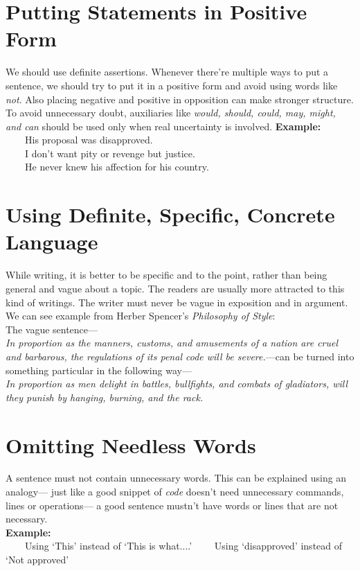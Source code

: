 \documentclass{report}
\newcommand{\xmpl}{\textbf{Example:}\\} %
\newcommand{\indnt}{\ \ \ \ } %
\begin{document}
\section{Putting Statements in Positive Form}
We should use definite assertions. Whenever there're multiple ways to put a sentence, we should try to put it in a positive form and avoid using words like \emph{not}. Also placing negative and positive in opposition can make stronger structure. To avoid unnecessary doubt, auxiliaries like \emph{would, should, could, may, might, \emph{and} can} should be used only when real uncertainty is involved.
\xmpl
\indnt His proposal was disapproved.\\
\indnt I don't want pity or revenge but justice.\\
\indnt He never knew his affection for his country.\\
\section{Using Definite, Specific, Concrete Language}
While writing, it is better to be specific and to the point, rather than being general and vague about a topic. The readers are usually more attracted to this kind of writings. The writer must never be vague in exposition and in argument. We can see example from Herber Spencer's \textit{Philosophy of Style}:\\
The vague sentence---\\ \textit{In proportion as the manners, customs, and amusements of a nation are cruel and barbarous, the regulations of its penal code will be severe.}---can be turned into something particular in the following way---\\
\textit{In proportion as men delight in battles, bullfights, and combats of gladiators, will they punish by hanging, burning, and the rack.}\\
\section{Omitting Needless Words}
A sentence must not contain unnecessary words. This can be explained using an analogy--- just like a good snippet of \textit{code} doesn't need unnecessary commands, lines or operations--- a good sentence mustn't have words or lines that are not necessary.\\
\xmpl
\indnt Using `This' instead of `This is what....'
\indnt Using `disapproved' instead of `Not approved'\\
\end{document}
